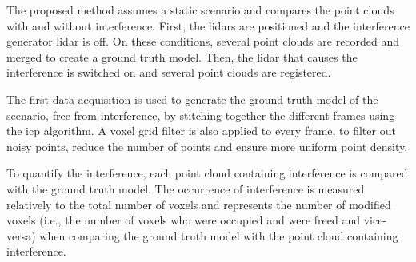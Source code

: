 \documentclass[extendedabs]{recpad2k}
\begin{document}
The proposed method assumes a static scenario and compares the point clouds with and without interference. First, the \gls{lidar}s are positioned and the interference generator \gls{lidar} is off. On these conditions, several point clouds are recorded and merged to create a ground truth model. Then, the \gls{lidar} that causes the interference is switched on and several point clouds are registered.

The first data acquisition is used to generate the ground truth model of the scenario, free from interference, by stitching together the different frames using the \gls{icp} algorithm. A voxel grid filter is also applied to every frame, to filter out noisy points, reduce the number of points and ensure more uniform point density.





To quantify the interference, each point cloud containing interference is compared with the ground truth model.
The occurrence of interference is measured relatively to the total number of voxels and represents the number of modified voxels (i.e., the number of voxels who were occupied and were freed and vice-versa) when comparing the ground truth model with the point cloud containing interference.
\end{document}

